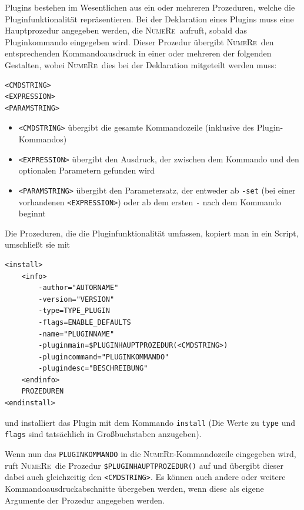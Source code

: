 \documentclass[DIV=14,headsepline,footsepline]{scrbook}
\newcommand{\NR}{\textsc{Nu\-me\-Re}}
\begin{document}
				Plugins bestehen im Wesentlichen aus ein oder mehreren Prozeduren, welche die Pluginfunktionalität repräsentieren. Bei der Deklaration eines Plugins muss eine Hauptprozedur angegeben werden, die \NR\ aufruft, sobald das Pluginkommando eingegeben wird. Dieser Prozedur übergibt \NR\ den entsprechenden Kommandoausdruck in einer oder mehreren der folgenden Gestalten, wobei \NR\ dies bei der Deklaration mitgeteilt werden muss:
				\begin{lstlisting}
<CMDSTRING>
<EXPRESSION>
<PARAMSTRING>
				\end{lstlisting}
				\begin{itemize}
					\item \verb+<CMDSTRING>+ übergibt die gesamte Kommandozeile (inklusive des Plugin-Kommandos)
					\item \verb+<EXPRESSION>+ übergibt den Ausdruck, der zwischen dem Kommando und den optionalen Parametern gefunden wird
					\item \verb+<PARAMSTRING>+ übergibt den Parametersatz, der entweder ab \verb+-set+ (bei einer vorhandenen \verb+<EXPRESSION>+) oder ab dem ersten \verb+-+ nach dem Kommando beginnt
				\end{itemize}
				
				Die Prozeduren, die die Pluginfunktionalität umfassen, kopiert man in ein Script, umschließt sie mit
				\begin{lstlisting}
<install>
	<info>
		-author="AUTORNAME"
		-version="VERSION"
		-type=TYPE_PLUGIN
		-flags=ENABLE_DEFAULTS
		-name="PLUGINNAME"
		-pluginmain=$PLUGINHAUPTPROZEDUR(<CMDSTRING>)
		-plugincommand="PLUGINKOMMANDO"
		-plugindesc="BESCHREIBUNG"
	<endinfo>
	PROZEDUREN
<endinstall>
				\end{lstlisting}
				und installiert das Plugin mit dem Kommando \verb+install+ (Die Werte zu \verb+type+ und \verb+flags+ sind tatsächlich in Großbuchstaben anzugeben).
				
				Wenn nun das \verb+PLUGINKOMMANDO+ in die \NR-Kommandozeile eingegeben wird, ruft \NR\ die Prozedur \verb+$PLUGINHAUPTPROZEDUR()+ auf und übergibt dieser dabei auch gleichzeitig den \verb+<CMDSTRING>+. Es können auch andere oder weitere Kommandoausdruckabschnitte übergeben werden, wenn diese als eigene Argumente der Prozedur angegeben werden.
				
\end{document}
